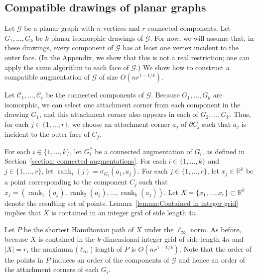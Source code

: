 \documentclass{patmorin}
\DeclareMathOperator{\rank}{rank}
\newcommand{\R}{\mathbb{R}}
\begin{document}
\subsection{Compatible drawings of planar graphs}
Let $\mathcal G$ be a planar graph with $n$ vertices and $r$ connected
components.  Let $G_1, \ldots, G_k$ be $k$ planar isomorphic drawings
of $\mathcal G$.  For now, we will assume that, in these drawings,
every component of $\mathcal G$ has at least one vertex incident to
the outer face.  (In the Appendix, we show that this is not a real
restriction; one can apply the same algorithm to each face of $\mathcal
G$.)  We show how to construct a compatible augmentation of $\mathcal G$
of size $O(nr^{1-1/k})$.

Let $\mathcal C_1, \ldots, \mathcal C_r$ be the connected components of $\mathcal G$.  Because $G_1,\ldots,G_k$ are isomorphic, we can select one attachment corner from each component in the drawing $G_1$, and this attachment corner also appears in each of $G_2,\ldots,G_k$. Thus, for each $j\in\{1,\ldots,r\}$, we choose an attachment corner $a_j$ of $\partial C_j$ such that $a_j$ is incident to the outer face of $C_j$.

For each $i\in \{1,\dots,k\}$, let $G_i^*$ be a connected augmentation of $G_i$, as defined in Section~\ref{section: connected augmentations}. For each $i\in\{1,\ldots,k\}$ and $j\in\{1,\ldots,r\}$, let $\rank_i(j) = \sigma_{G_i}(a_1, a_j)$. For each $j\in\{1,\ldots,r\}$, let $x_j\in \mathbb{R}^k$ be a point corresponding to the component $C_j$ such that $x_j = (\rank_1(a_j), \rank_2(a_j), \ldots, \rank_k(a_j))$. Let $X = \{x_1, \ldots, x_r\}\subset\R^k$ denote the resulting set of points. Lemma~\ref{lemma:Contained in integer grid} implies that $X$ is contained in an integer grid of side length $4n$.

Let $P$ be the shortest Hamiltonian path of $X$ under the $\ell_\infty$ norm. As before, because $X$ is contained in the $k$-dimensional integer grid of side-length $4n$ and $|X| = r$, the maximum ($\ell_\infty$) length of $P$ is $O(nr^{1-1/k})$. Note that the order of the points in $P$ induces an order of the components of $\mathcal G$ and hence an order of the attachment corners of each $G_i$.
\end{document}
